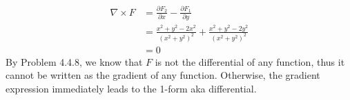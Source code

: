 \documentclass[12pt]{article}
\begin{document}
\begin{problem}[4.5.2]
\begin{align*}
	\nabla \times F &= \frac{\partial F_2}{\partial x} - \frac{\partial F_1}{\partial y}  \\
	&= \frac{x^2+y^2-2x^2}{ (x^2+y^2)^2} + \frac{x^2+y^2-2y^2}{ (x^2+y^2)^2} \\
	&= 0 
\end{align*}
By Problem 4.4.8, we know that $ F$ is not the differential of any function, thus it cannot be written as the gradient of any function. Otherwise, the gradient expression immediately leads to the 1-form aka differential.
\end{problem}
\end{document}
